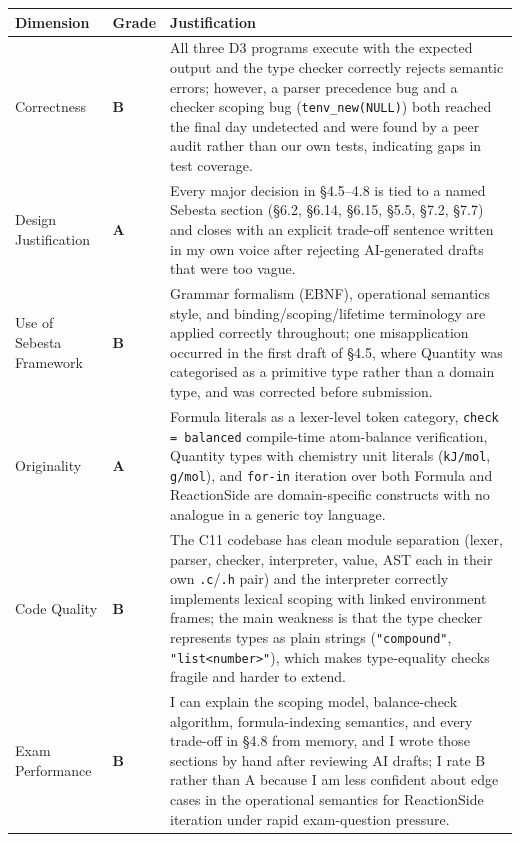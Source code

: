 \documentclass[11pt,a4paper]{article}
\newcommand{\code}[1]{\texttt{#1}}
\newcommand{\grade}[1]{\textbf{#1}}
\begin{document}
\vspace{4pt}
\begin{tabularx}{\textwidth}{@{} L{3.5cm} L{1.0cm} Y @{}}
\toprule
\textbf{Dimension} & \textbf{Grade} & \textbf{Justification} \\
\midrule
Correctness &
\grade{B} &
All three D3 programs execute with the expected output and the type checker correctly rejects semantic errors; however, a parser precedence bug and a checker scoping bug (\code{tenv\_new(NULL)}) both reached the final day undetected and were found by a peer audit rather than our own tests, indicating gaps in test coverage. \\[4pt]

Design Justification &
\grade{A} &
Every major decision in §4.5--4.8 is tied to a named Sebesta section (\S6.2, \S6.14, \S6.15, \S5.5, \S7.2, \S7.7) and closes with an explicit trade-off sentence written in my own voice after rejecting AI-generated drafts that were too vague. \\[4pt]

Use of Sebesta Framework &
\grade{B} &
Grammar formalism (EBNF), operational semantics style, and binding/scoping/lifetime terminology are applied correctly throughout; one misapplication occurred in the first draft of §4.5, where Quantity was categorised as a primitive type rather than a domain type, and was corrected before submission. \\[4pt]

Originality &
\grade{A} &
Formula literals as a lexer-level token category, \code{check = balanced} compile-time atom-balance verification, Quantity types with chemistry unit literals (\code{kJ/mol}, \code{g/mol}), and \code{for-in} iteration over both Formula and ReactionSide are domain-specific constructs with no analogue in a generic toy language. \\[4pt]

Code Quality &
\grade{B} &
The C11 codebase has clean module separation (lexer, parser, checker, interpreter, value, AST each in their own \code{.c}/\code{.h} pair) and the interpreter correctly implements lexical scoping with linked environment frames; the main weakness is that the type checker represents types as plain strings (\code{"compound"}, \code{"list<number>"}), which makes type-equality checks fragile and harder to extend. \\[4pt]

Exam Performance &
\grade{B} &
I can explain the scoping model, balance-check algorithm, formula-indexing semantics, and every trade-off in §4.8 from memory, and I wrote those sections by hand after reviewing AI drafts; I rate B rather than A because I am less confident about edge cases in the operational semantics for ReactionSide iteration under rapid exam-question pressure. \\
\bottomrule
\end{tabularx}
\end{document}
